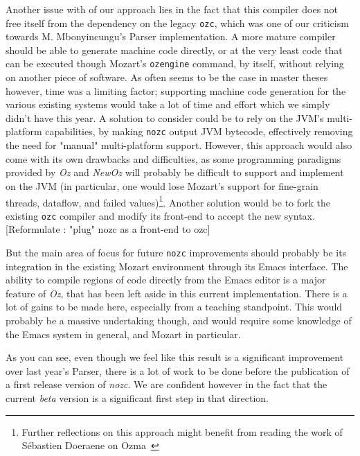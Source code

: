 Another issue with of our approach lies in the fact that this compiler does not free itself from the dependency on the legacy \texttt{ozc}, which was one of our criticism towards M. Mbonyincungu's Parser implementation.
A more mature compiler should be able to generate machine code directly, or at the very least code that can be executed though Mozart's \texttt{ozengine} command, by itself, without relying on another piece of software.
As often seems to be the case in master theses however, time was a limiting factor;
supporting machine code generation for the various existing systems would take a lot of time and effort which we simply didn't have this year.\newline
A solution to consider could be to rely on the JVM's multi-platform capabilities, by making \texttt{nozc} output JVM bytecode, effectively removing the need for  "manual" multi-platform support.
However, this approach would also come with its own drawbacks and difficulties, as some programming paradigms provided by \textit{Oz} and \textit{NewOz} will probably be difficult to support and implement on the JVM (in particular, one would lose Mozart's support for fine-grain threads, dataflow, and failed values)\footnote{Further reflections on this approach might benefit from reading the work of Sébastien Doeraene on Ozma~\cite{Ozma}}.\newline
Another solution would be to fork the existing \texttt{ozc} compiler and modify its front-end to accept the new syntax.[Reformulate : "plug" nozc as a front-end to ozc]\newline

But the main area of focus for future \texttt{nozc} improvements should probably be its integration in the existing Mozart environment through its Emacs interface.
The ability to compile regions of code directly from the Emacs editor is a major feature of \textit{Oz}, that has been left aside in this current implementation.
There is a lot of gains to be made here, especially from a teaching standpoint.
This would probably be a massive undertaking though, and would require some knowledge of the Emacs system in general, and Mozart in particular.\newline

As you can see, even though we feel like this result is a significant improvement over last year's Parser, there is a lot of work to be done before the publication of a first release version of \textit{nozc}.
We are confident however in the fact that the current \textit{beta} version is a significant first step in that direction.